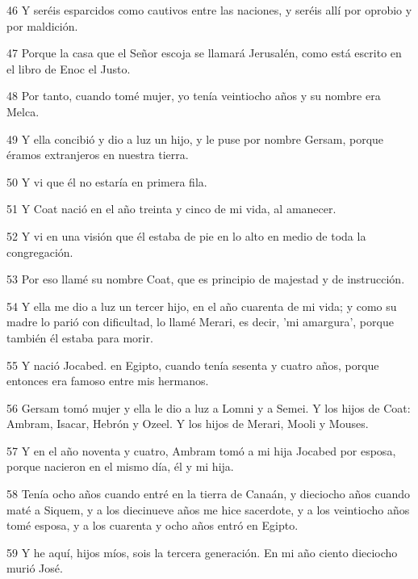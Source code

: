 \par 46 Y seréis esparcidos como cautivos entre las naciones, y seréis allí por oprobio y por maldición.

\par 47 Porque la casa que el Señor escoja se llamará Jerusalén, como está escrito en el libro de Enoc el Justo.

\par 48 Por tanto, cuando tomé mujer, yo tenía veintiocho años y su nombre era Melca.

\par 49 Y ella concibió y dio a luz un hijo, y le puse por nombre Gersam, porque éramos extranjeros en nuestra tierra.

\par 50 Y vi que él no estaría en primera fila.

\par 51 Y Coat nació en el año treinta y cinco de mi vida, al amanecer.

\par 52 Y vi en una visión que él estaba de pie en lo alto en medio de toda la congregación.

\par 53 Por eso llamé su nombre Coat, que es principio de majestad y de instrucción.

\par 54 Y ella me dio a luz un tercer hijo, en el año cuarenta de mi vida; y como su madre lo parió con dificultad, lo llamé Merari, es decir, 'mi amargura', porque también él estaba para morir.

\par 55 Y nació Jocabed. en Egipto, cuando tenía sesenta y cuatro años, porque entonces era famoso entre mis hermanos.

\par 56 Gersam tomó mujer y ella le dio a luz a Lomni y a Semei. Y los hijos de Coat: Ambram, Isacar, Hebrón y Ozeel. Y los hijos de Merari, Mooli y Mouses.

\par 57 Y en el año noventa y cuatro, Ambram tomó a mi hija Jocabed por esposa, porque nacieron en el mismo día, él y mi hija.

\par 58 Tenía ocho años cuando entré en la tierra de Canaán, y dieciocho años cuando maté a Siquem, y a los diecinueve años me hice sacerdote, y a los veintiocho años tomé esposa, y a los cuarenta y ocho años entró en Egipto.

\par 59 Y he aquí, hijos míos, sois la tercera generación. En mi año ciento dieciocho murió José.

